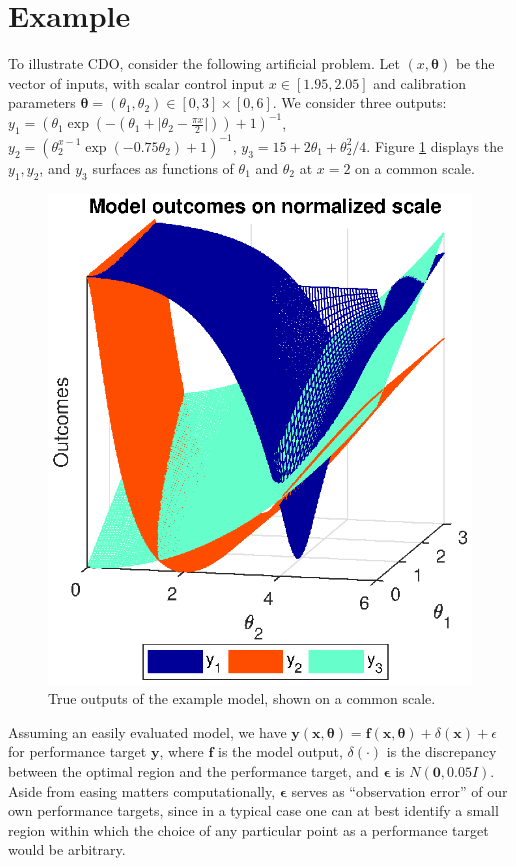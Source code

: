 \documentclass[12pt]{article}
\begin{document}
\section{Example}\label{example}
To illustrate CDO, consider the following artificial problem. 
%
Let $(x,\boldsymbol \theta)$ be the vector of inputs, with scalar control input $x\in[1.95,2.05]$ and calibration parameters $\boldsymbol \theta = (\theta_1,\theta_2)\in[0,3]\times[0,6]$.
%
We consider three outputs:
%
$
y_1 = \left(\theta_1 \exp\left(-\left(\theta_1 + \lvert \theta_2-\frac{\pi x}2\rvert \right)\right)+1\right)^{-1}$, 
$
y_2 = \left(\theta_2^{x-1} \exp\left(-0.75 \theta_2\right) + 1 \right)^{-1}
$, 
$
y_3 = 15 + 2 \theta_1 + {\theta_2^2}/4.
$
%
Figure \ref{fig:toy_sim_outputs} displays the $y_1, y_2$, and $y_3$ surfaces as functions of $\theta_1$ and $\theta_2$ at $x = 2$ on a common scale.
%
\begin{figure}
\centering
\includegraphics[scale=.8]{FIG_toy_sim_model_outputs.eps}
\caption{True outputs of the example model, shown on a common scale.}
\label{fig:toy_sim_outputs}
\end{figure}
%
Assuming an easily evaluated model, we have
%
$
\mathbf y(\mathbf x, \boldsymbol\theta) = \mathbf f(\mathbf x,\boldsymbol \theta) + \delta(\mathbf x) + \epsilon
$
%
for performance target $\mathbf y$, where $\mathbf f$ is the model output, $\delta(\cdot)$ is the discrepancy between the optimal region and the performance target, and $\boldsymbol \epsilon$ is $N(\mathbf 0,0.05I)$. 
%
Aside from easing matters computationally, $\boldsymbol \epsilon$ serves as ``observation error'' of our own performance targets, since in a typical case one can at best identify a small region within which the choice of any particular point as a performance target would be arbitrary.
%
\end{document}
